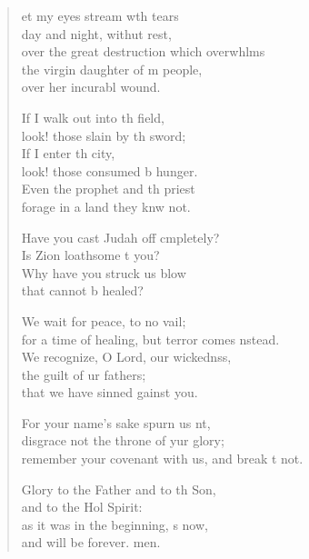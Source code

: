 \settowidth{\versewidth}{remember your covenant with us, and break it not.}
\begin{verse}%
  \begin{patverse}
et my eyes stream w\pointup{\i}th tears\Med\\
day and night, withut rest,\\
over the great destruction which overwhlms\Flex\\
the virgin daughter of m people,\Med\\
over her incurabl wound.

If I walk out into th field,\Med\\
look! those slain by th sword;\\
If I enter th city,\Med\\
look! those consumed b hunger.\\
Even the prophet and th priest\Med\\
forage in a land they knw not.

Have you cast Judah off cmpletely?\Med\\
Is Zion loathsome t you?\\
Why have you struck us  blow\Med\\
that cannot b healed?

We wait for peace, to no vail;\Med\\
for a time of healing, but terror comes \pointup{\i}nstead.\\
We recognize, O Lord, our wickednss,\Flex\\
the guilt of ur fathers;\Med\\
that we have sinned gainst you.

For your name’s sake spurn us nt,\Flex\\
disgrace not the throne of yur glory;\Med\\
remember your covenant with us, and break \pointup{\i}t not.

Glory to the Father and to th Son,\Med\\
and to the Hol Spirit:\\
as it was in the beginning, \pointup{\i}s now,\Med\\
and will be forever. men.
  \end{patverse}
\end{verse}
